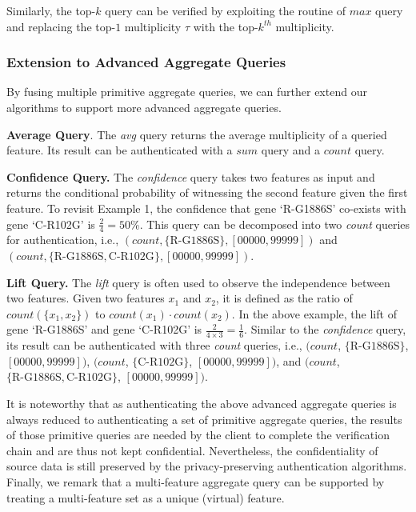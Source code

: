 Similarly, the top-$k$ query can be verified by exploiting the routine of $max$ query and replacing the top-$1$ multiplicity $\tau$ with the top-$k^{th}$ multiplicity. %

\subsubsection{Extension to Advanced Aggregate Queries}\label{sec:aggregate-queries:extension}

By fusing multiple primitive aggregate queries, we can further extend our algorithms to support more advanced aggregate queries.

\textbf{Average Query}. The \emph{avg} query returns the average multiplicity of a queried feature. Its result can be authenticated with a $sum$ query and a $count$ query.

\textbf{Confidence Query.} The \emph{confidence} query takes two features as input and returns the conditional probability of witnessing the second feature given the first feature. To revisit Example 1, the confidence that gene `R-G1886S' co-exists with gene `C-R102G' is $\frac{2}{4}=50$\%. This query can be decomposed into two \emph{count} queries for authentication, i.e., $(count, \{\text{R-G1886S}\}, [00000, 99999])$ and $(count, \{\text{R-G1886S}, \text{C-R102G}\}, [00000, 99999])$.

\textbf{Lift Query.} The \emph{lift} query is often used to observe the independence between two features. Given two features $x_1$ and $x_2$, it is defined as the ratio of $count(\{x_1, x_2\})$ to $count({x_1}) \cdot count(x_2)$. In the above example, the lift of gene `R-G1886S' and gene `C-R102G' is $\frac{2}{4 \times 3}=\frac{1}{6}$. Similar to the \emph{confidence} query, its result can be authenticated with three \emph{count} queries, i.e., $(count$, $\{\text{R-G1886S}\}$, $[00000, 99999])$, $(count$, $\{\text{C-R102G}\}$, $[00000, 99999])$, and $(count$, $\{\text{R-G1886S}, \text{C-R102G}\}$, $[00000, 99999])$.

It is noteworthy that as authenticating the above advanced aggregate queries is always reduced to authenticating a set of primitive aggregate queries, the results of those primitive queries are needed by the client to complete the verification chain and are thus not kept confidential. Nevertheless, the confidentiality of source data is still preserved by the privacy-preserving authentication algorithms. Finally, we remark that a multi-feature aggregate query can be supported by treating a multi-feature set as a unique (virtual) feature.

